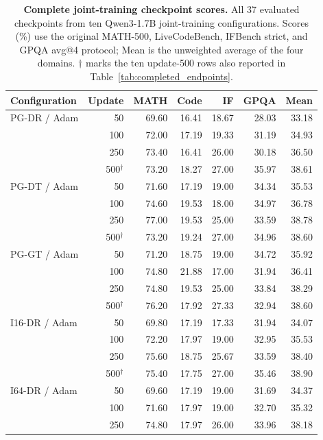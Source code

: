\begin{table}[p]
\centering
\caption{\textbf{Complete joint-training checkpoint scores.} All 37 evaluated checkpoints from ten Qwen3-1.7B joint-training configurations. Scores (\%) use the original MATH-500, LiveCodeBench, IFBench strict, and GPQA avg@4 protocol; Mean is the unweighted average of the four domains. $\dagger$ marks the ten update-500 rows also reported in Table~\ref{tab:completed_endpoints}.}
\label{tab:qwen_all_checkpoints}
\begingroup
\footnotesize
\setlength{\tabcolsep}{5pt}
\renewcommand{\arraystretch}{1.02}
\begin{tabular}{lrrrrrr}
\toprule
Configuration & Update & MATH & Code & IF & GPQA & Mean \\
\midrule
PG-DR / Adam & 50 & 69.60 & 16.41 & 18.67 & 28.03 & 33.18 \\
 & 100 & 72.00 & 17.19 & 19.33 & 31.19 & 34.93 \\
 & 250 & 73.40 & 16.41 & 26.00 & 30.18 & 36.50 \\
 & 500$^{\dagger}$ & 73.20 & 18.27 & 27.00 & 35.97 & 38.61 \\
\addlinespace[2pt]
PG-DT / Adam & 50 & 71.60 & 17.19 & 19.00 & 34.34 & 35.53 \\
 & 100 & 74.60 & 19.53 & 18.00 & 34.97 & 36.78 \\
 & 250 & 77.00 & 19.53 & 25.00 & 33.59 & 38.78 \\
 & 500$^{\dagger}$ & 73.20 & 19.24 & 27.00 & 34.96 & 38.60 \\
\addlinespace[2pt]
PG-GT / Adam & 50 & 71.20 & 18.75 & 19.00 & 34.72 & 35.92 \\
 & 100 & 74.80 & 21.88 & 17.00 & 31.94 & 36.41 \\
 & 250 & 74.80 & 19.53 & 25.00 & 33.84 & 38.29 \\
 & 500$^{\dagger}$ & 76.20 & 17.92 & 27.33 & 32.94 & 38.60 \\
\addlinespace[2pt]
I16-DR / Adam & 50 & 69.80 & 17.19 & 17.33 & 31.94 & 34.07 \\
 & 100 & 72.20 & 17.97 & 19.00 & 32.95 & 35.53 \\
 & 250 & 75.60 & 18.75 & 25.67 & 33.59 & 38.40 \\
 & 500$^{\dagger}$ & 75.40 & 17.75 & 27.00 & 35.46 & 38.90 \\
\addlinespace[2pt]
I64-DR / Adam & 50 & 69.60 & 17.19 & 19.00 & 31.69 & 34.37 \\
 & 100 & 71.60 & 17.97 & 19.00 & 32.70 & 35.32 \\
 & 250 & 74.80 & 17.97 & 26.00 & 33.96 & 38.18 \\

\end{tabular}
\end{table}
